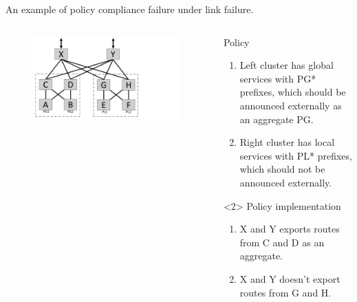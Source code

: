 \begin{frame}{An example of policy compliance failure under link failure.}
    \begin{columns}
        \begin{column}{0.45\textwidth}
            \begin{figure}
                \includegraphics[width=1\textwidth,keepaspectratio,clip,trim={0cm 0cm 9cm 0cm}]{figures/ex2_clean.pdf}
            \end{figure}
        \end{column}
        \begin{column}{0.50\textwidth}
            \begin{block}{Policy}
                \begin{enumerate}
                    \item Left cluster has global services with PG* prefixes, which should be announced externally as an aggregate PG.
                    \item Right cluster has local services with PL* prefixes, which should not be announced externally.
                \end{enumerate}
            \end{block}
            \begin{block}<2>    {Policy implementation}
                \begin{enumerate}
                    \item X and Y exports routes from C and D as an aggregate.
                    \item X and Y doesn't export routes from G and H.
                \end{enumerate}
            \end{block}
        \end{column}
    \end{columns}
\end{frame}

